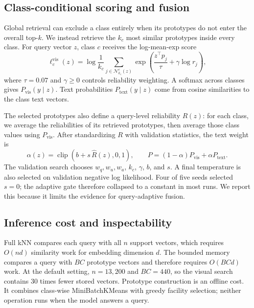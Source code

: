 \documentclass[10pt,twocolumn]{article}
\begin{document}
\subsection{Class-conditional scoring and fusion}

Global retrieval can exclude a class entirely when its prototypes do not enter the
overall top-$k$. We instead retrieve the $k_c$ most similar prototypes inside every
class. For query vector $z$, class $c$ receives the log-mean-exp score
\begin{equation}
\ell_c^{\mathrm{vis}}(z)=
\log\frac{1}{k_c}\sum_{j\in\mathcal{N}_{k_c}^{c}(z)}
\exp\!\left(\frac{z^\top p_j}{\tau}+\gamma\log r_j\right),
\label{eq:visual}
\end{equation}
where $\tau=0.07$ and $\gamma\geq0$ controls reliability weighting. A softmax across
classes gives $P_{\mathrm{vis}}(y\mid z)$. Text probabilities
$P_{\mathrm{text}}(y\mid z)$ come from cosine similarities to the class text vectors.

The selected prototypes also define a query-level reliability $R(z)$: for each class,
we average the reliabilities of its retrieved prototypes, then average those class
values using $P_{\mathrm{vis}}$. After standardizing $R$ with validation statistics, the
text weight is
\begin{equation}
\alpha(z)=\operatorname{clip}(b+s\,\widehat R(z),0,1),
\qquad
P=(1-\alpha)P_{\mathrm{vis}}+\alpha P_{\mathrm{text}}.
\label{eq:fusion}
\end{equation}
The validation search chooses $w_q,w_u,w_a$, $k_c$, $\gamma$, $b$, and $s$. A final
temperature is also selected on validation negative log likelihood. Four of five seeds
selected $s=0$; the adaptive gate therefore collapsed to a constant in most runs. We
report this because it limits the evidence for query-adaptive fusion.

\subsection{Inference cost and inspectability}

Full kNN compares each query with all $n$ support vectors, which requires
$O(nd)$ similarity work for embedding dimension $d$. The bounded memory compares a
query with $BC$ prototype vectors and therefore requires $O(BCd)$ work. At the default
setting, $n=13{,}200$ and $BC=440$, so the visual search contains 30 times fewer stored
vectors. Prototype construction is an offline cost. It combines class-wise
MiniBatchKMeans with greedy facility selection; neither operation runs when the model
answers a query.
\end{document}
